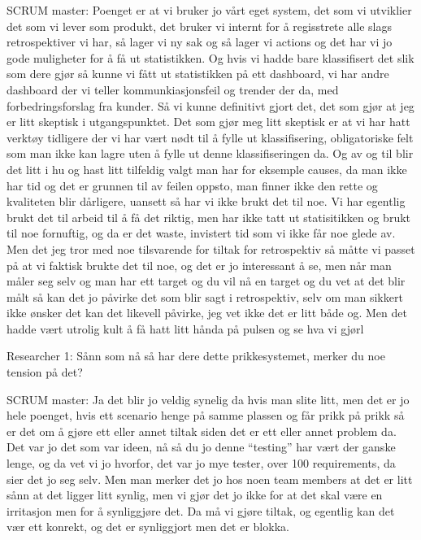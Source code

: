 \documentclass[12pt, a4paper]{report}
\begin{document}
SCRUM master: Poenget er at vi bruker jo vårt eget system, det som vi utviklier det som vi lever som produkt, det bruker vi internt for å regisstrete alle slags retrospektiver vi har, så lager vi ny sak og så lager vi actions og det har vi jo gode muligheter for å få ut statistikken. Og hvis vi hadde bare klassifisert det slik som dere gjør så kunne vi fått ut statistikken på ett dashboard, vi har andre dashboard der vi teller kommunkiasjonsfeil og trender der da, med forbedringsforslag fra kunder. Så vi kunne definitivt gjort det, det som gjør at jeg er litt skeptisk i utgangspunktet. Det som gjør meg litt skeptisk er at vi har hatt verktøy tidligere der vi har vært nødt til å fylle ut klassifisering, obligatoriske felt som man ikke kan lagre uten å fylle ut denne klassifiseringen da. Og av og til blir det litt i hu og hast litt tilfeldig valgt man har for eksemple causes, da man ikke har tid og det er grunnen til av feilen oppsto, man finner ikke den rette og kvaliteten blir dårligere, uansett så har vi ikke brukt det til noe. Vi har egentlig brukt det til arbeid til å få det riktig, men har ikke tatt ut statisitikken og brukt til noe fornuftig, og da er det waste, invistert tid som vi ikke får noe glede av. Men det jeg tror med noe tilsvarende for tiltak for retrospektiv så måtte vi passet på at vi faktisk brukte det til noe, og det er jo interessant å se, men når man måler seg selv og man har ett target og du vil nå en target og du vet at det blir målt så kan det jo påvirke det som blir sagt i retrospektiv, selv om man sikkert ikke ønsker det kan det likevell påvirke, jeg vet ikke det er litt både og. Men det hadde vært utrolig kult å få hatt litt hånda på pulsen og se hva vi gjørl

Researcher 1: Sånn som nå så har dere dette prikkesystemet, merker du noe tension på det?

SCRUM master: Ja det blir jo veldig synelig da hvis man slite litt, men det er jo hele poenget, hvis ett scenario henge på samme plassen og får prikk på prikk så er det om å gjøre ett eller annet tiltak siden det er ett eller annet problem da. Det var jo det som var ideen, nå så du jo denne ``testing'' har vært der ganske lenge, og da vet vi jo hvorfor, det var jo mye tester, over 100 requirements, da sier det jo seg selv. Men man merker det jo hos noen team members at det er litt sånn at det ligger litt synlig, men vi gjør det jo ikke for at det skal være en irritasjon men for å synliggjøre det. Da må vi gjøre tiltak, og egentlig kan det vær ett konrekt, og det er synliggjort men det er blokka. 
\end{document}
